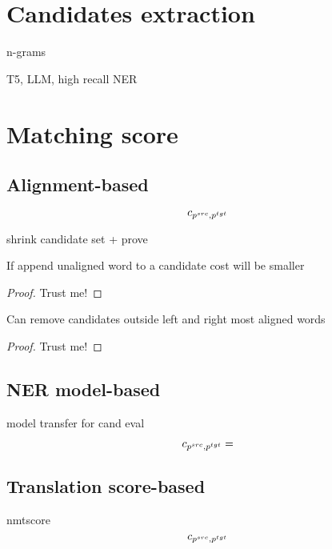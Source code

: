 \section{Candidates extraction}
n-grams

T5, LLM, high recall NER

\section{Matching score}
\subsection{Alignment-based}

\begin{equation} \label{eq:align_cost}
    c_{p^{src}, p^{tgt}}
\end{equation}

shrink candidate set + prove

\begin{lemma}
    If append unaligned word to a candidate cost will be smaller
\end{lemma}
\begin{proof}
    Trust me!
\end{proof}

\begin{theorem}
    Can remove candidates outside left and right most aligned words
\end{theorem}
\begin{proof}
    Trust me!
\end{proof}

\subsection{NER model-based}

model transfer for cand eval

\begin{equation} \label{eq:ner_cost}
    c_{p^{src}, p^{tgt}} =
\end{equation}

\subsection{Translation score-based}

nmtscore
\begin{equation} \label{eq:nmt_cost}
    c_{p^{src}, p^{tgt}}
\end{equation}


